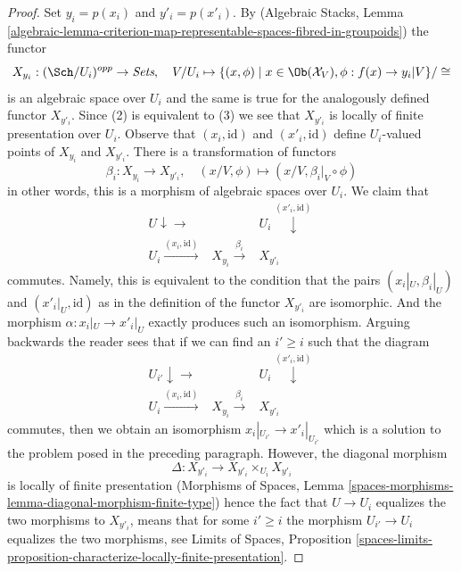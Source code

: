 \begin{proof}
\medskip\noindent
Set $y_i = p(x_i)$ and $y'_i = p(x'_i)$.
By (Algebraic Stacks, Lemma
\ref{algebraic-lemma-criterion-map-representable-spaces-fibred-in-groupoids})
the functor
$$
X_{y_i} : (\Sch/U_i)^{opp} \to \textit{Sets},\quad
V/U_i \mapsto
\{(x, \phi) \mid x \in \Ob(\mathcal{X}_V), \phi : f(x) \to y_i|V\}/\cong
$$
is an algebraic space over $U_i$ and the same is true for the
analogously defined functor $X_{y'_i}$. Since (2) is equivalent to (3)
we see that $X_{y'_i}$ is locally of finite presentation over $U_i$.
Observe that $(x_i, \text{id})$ and $(x'_i, \text{id})$ define
$U_i$-valued points of $X_{y_i}$ and $X_{y'_i}$.
There is a transformation of functors
$$
\beta_i : X_{y_i} \to X_{y'_i},\quad
(x/V, \phi) \mapsto (x/V, \beta_i|_V \circ \phi)
$$
in other words, this is a morphism of algebraic spaces over $U_i$.
We claim that
$$
\begin{array}{ccc}U \downarrow\longrightarrow &  & U_i \overset{(x'_i, \text{id})}{\downarrow} \\ U_i \overset{(x_i, \text{id})}{\longrightarrow} & X_{y_i} \overset{\beta_i}{\longrightarrow} & X_{y'_i}\end{array}
$$
commutes. Namely, this is equivalent to the condition that
the pairs $(x_i|_U, \beta_i|_U)$ and $(x'_i|_U, \text{id})$
as in the definition of the functor $X_{y'_i}$ are isomorphic.
And the morphism $\alpha : x_i|_U \to x'_i|_U$ exactly produces
such an isomorphism. Arguing backwards the reader sees that
if we can find an $i' \geq i$ such that the diagram
$$
\begin{array}{ccc}U_{i'} \downarrow\longrightarrow &  & U_i \overset{(x'_i, \text{id})}{\downarrow} \\ U_i \overset{(x_i, \text{id})}{\longrightarrow} & X_{y_i} \overset{\beta_i}{\longrightarrow} & X_{y'_i}\end{array}
$$
commutes, then we obtain an isomorphism $x_i|_{U_{i'}} \to x'_i|_{U_{i'}}$
which is a solution to the problem posed in the preceding paragraph.
However, the diagonal morphism
$$
\Delta : X_{y'_i} \to X_{y'_i} \times_{U_i} X_{y'_i}
$$
is locally of finite presentation (Morphisms of Spaces, Lemma
\ref{spaces-morphisms-lemma-diagonal-morphism-finite-type})
hence the fact that $U \to U_i$ equalizes the two morphisms to $X_{y'_i}$,
means that for some $i' \geq i$ the morphism $U_{i'} \to U_i$
equalizes the two morphisms, see
Limits of Spaces, Proposition
\ref{spaces-limits-proposition-characterize-locally-finite-presentation}.
\end{proof}

